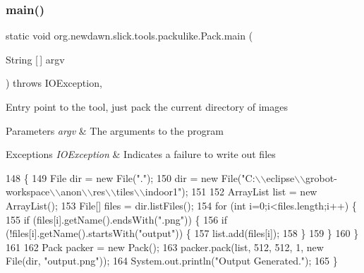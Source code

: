 \subsubsection{\texorpdfstring{main()}{main()}}
{\footnotesize\ttfamily static void org.\+newdawn.\+slick.\+tools.\+packulike.\+Pack.\+main (\begin{DoxyParamCaption}\item[{String \mbox{[}$\,$\mbox{]}}]{argv }\end{DoxyParamCaption}) throws I\+O\+Exception\hspace{0.3cm}{\ttfamily [inline]}, {\ttfamily [static]}}

Entry point to the tool, just pack the current directory of images


\begin{DoxyParams}{Parameters}
{\em argv} & The arguments to the program \\
\hline
\end{DoxyParams}

\begin{DoxyExceptions}{Exceptions}
{\em I\+O\+Exception} & Indicates a failure to write out files \\
\hline
\end{DoxyExceptions}

\begin{DoxyCode}
148                                                               \{
149         File dir = \textcolor{keyword}{new} File(\textcolor{stringliteral}{"."});
150         dir = \textcolor{keyword}{new} File(\textcolor{stringliteral}{"C:\(\backslash\)\(\backslash\)eclipse\(\backslash\)\(\backslash\)grobot-workspace\(\backslash\)\(\backslash\)anon\(\backslash\)\(\backslash\)res\(\backslash\)\(\backslash\)tiles\(\backslash\)\(\backslash\)indoor1"});
151         
152         ArrayList list = \textcolor{keyword}{new} ArrayList();
153         File[] files = dir.listFiles();
154         \textcolor{keywordflow}{for} (\textcolor{keywordtype}{int} i=0;i<files.length;i++) \{
155             \textcolor{keywordflow}{if} (files[i].getName().endsWith(\textcolor{stringliteral}{".png"})) \{
156                 \textcolor{keywordflow}{if} (!files[i].getName().startsWith(\textcolor{stringliteral}{"output"})) \{
157                     list.add(files[i]);
158                 \}
159             \}
160         \}
161         
162         Pack packer = \textcolor{keyword}{new} Pack();
163         packer.pack(list, 512, 512, 1, \textcolor{keyword}{new} File(dir, \textcolor{stringliteral}{"output.png"}));
164         System.out.println(\textcolor{stringliteral}{"Output Generated."});
165     \}
\end{DoxyCode}
\mbox{\label{classorg_1_1newdawn_1_1slick_1_1tools_1_1packulike_1_1_pack_a9c82c8b100ebd308e42424b1dced8213}} 
